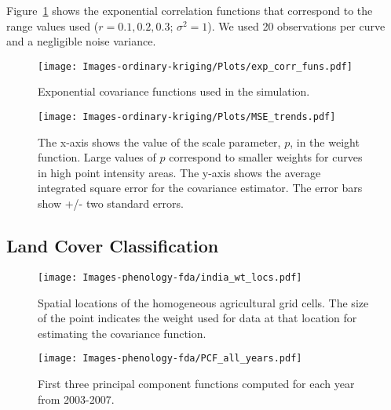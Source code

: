 Figure~\ref{fig:exp_corr_funs} shows the exponential correlation functions that correspond to the range values used ($r = 0.1, 0.2, 0.3$; $\sigma^2=1$). We used 20 observations per curve and a negligible noise variance. 

\begin{figure}
	\begin{center}
		\texttt{[image: Images-ordinary-kriging/Plots/exp\_corr\_funs.pdf]} 
	\end{center}
	\caption{Exponential covariance functions used in the simulation.} \label{fig:exp_corr_funs} 
\end{figure}

\begin{figure}
	\begin{center}
		\texttt{[image: Images-ordinary-kriging/Plots/MSE\_trends.pdf]} 
	\end{center}
	\caption{The x-axis shows the value of the scale parameter, $p$, in the weight function. Large values of $p$ correspond to smaller weights for curves in high point intensity areas. The y-axis shows the average integrated square error for the covariance estimator. The error bars show +/- two standard errors.} \label{fig:MSE_trends} 
\end{figure}

\subsection{Land Cover Classification} 

\label{sub:land_cover_classification}
\begin{figure}
	[htbp] \centering 
	\texttt{[image: Images-phenology-fda/india\_wt\_locs.pdf]} \caption{Spatial locations of the homogeneous agricultural grid cells. The size of the point indicates the weight used for data at that location for estimating the covariance function. } \label{fig:india weighted locs} 
\end{figure}
\begin{figure}
	[htbp] \centering 
	\texttt{[image: Images-phenology-fda/PCF\_all\_years.pdf]} \caption{First three principal component functions computed for each year from 2003-2007. } \label{fig:pcf all years} 
\end{figure}


